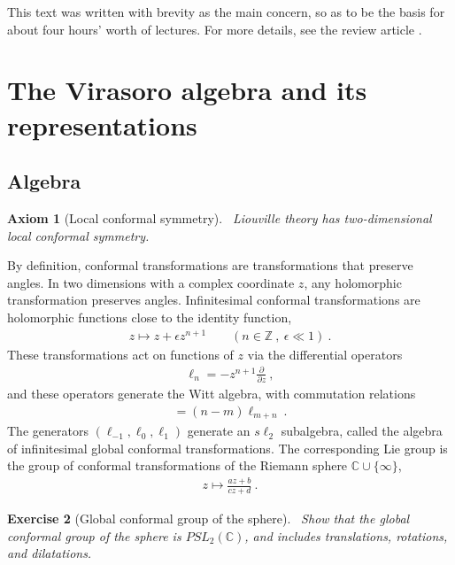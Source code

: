 \documentclass[12pt, a4paper]{article}
\theoremstyle{break}
\newtheorem{exo}{Exercise}[section]
\newtheorem{hyp}[exo]{Axiom}
\begin{document}
This text was written with brevity as the main concern, so as to be the basis for about four hours' worth of lectures. For more details, see the review article \cite{rib14}.


\section{The Virasoro algebra and its representations}

\subsection{Algebra}

\begin{hyp}[Local conformal symmetry]
 ~\label{hyp:loc}
 Liouville theory has two-dimensional local conformal symmetry.
\end{hyp}
By definition, conformal transformations are transformations that preserve angles. 
In two dimensions with a complex coordinate $z$, any holomorphic transformation preserves angles.
Infinitesimal conformal transformations are holomorphic functions close to the identity function, 
\begin{align}
 z \mapsto z + \epsilon z^{n+1}\qquad (n\in\mathbb{Z}\ , \ \epsilon\ll 1) \ .
\end{align}
These transformations act on functions of $z$ via the differential operators 
\begin{align}
 \ell_n = -z^{n+1}\frac{\partial}{\partial z}\ ,
\end{align}
and these operators generate the Witt algebra, with commutation relations
\begin{align}
 [\ell_n,\ell_m ] = (n-m)\ell_{m+n}\ .
\end{align}
The generators $(\ell_{-1},\ell_0,\ell_1)$ generate an $s\ell_2$ subalgebra, called the algebra of infinitesimal global conformal transformations.  The corresponding Lie group is the group of conformal transformations of 
the Riemann sphere $\mathbb{C}\cup \{\infty\}$,
\begin{align}
 z \mapsto \frac{az+b}{cz+d}\ .
\end{align}

\begin{exo}[Global conformal group of the sphere]
 ~\label{exo:sphere}
Show that the global conformal group of the sphere is $PSL_2(\mathbb{C})$, and includes translations, rotations, and dilatations. 
\end{exo}
\end{document}
